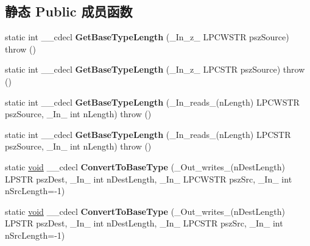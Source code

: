 \subsection*{静态 Public 成员函数}
\begin{DoxyCompactItemize}
\item 
\mbox{\label{class_a_t_l_1_1_ch_traits_c_r_t_3_01char_01_4_adeed7790ff8735455f8ae1ef589e29f2}} 
static int \+\_\+\+\_\+cdecl {\bfseries Get\+Base\+Type\+Length} (\+\_\+\+In\+\_\+z\+\_\+ L\+P\+C\+W\+S\+TR psz\+Source)  throw ()
\item 
\mbox{\label{class_a_t_l_1_1_ch_traits_c_r_t_3_01char_01_4_a719c0a99a89d2b62d39669a0d7d5be1a}} 
static int \+\_\+\+\_\+cdecl {\bfseries Get\+Base\+Type\+Length} (\+\_\+\+In\+\_\+z\+\_\+ L\+P\+C\+S\+TR psz\+Source)  throw ()
\item 
\mbox{\label{class_a_t_l_1_1_ch_traits_c_r_t_3_01char_01_4_a7b5636861c6a74c18d109f19419ca545}} 
static int \+\_\+\+\_\+cdecl {\bfseries Get\+Base\+Type\+Length} (\+\_\+\+In\+\_\+reads\+\_\+(n\+Length) L\+P\+C\+W\+S\+TR psz\+Source, \+\_\+\+In\+\_\+ int n\+Length)  throw ()
\item 
\mbox{\label{class_a_t_l_1_1_ch_traits_c_r_t_3_01char_01_4_a4024ea92fb975f57bca3d96a8671cfb2}} 
static int \+\_\+\+\_\+cdecl {\bfseries Get\+Base\+Type\+Length} (\+\_\+\+In\+\_\+reads\+\_\+(n\+Length) L\+P\+C\+S\+TR psz\+Source, \+\_\+\+In\+\_\+ int n\+Length)  throw ()
\item 
\mbox{\label{class_a_t_l_1_1_ch_traits_c_r_t_3_01char_01_4_a1bccd21d01f74118d7a79f47096ca535}} 
static \hyperlink{interfacevoid}{void} \+\_\+\+\_\+cdecl {\bfseries Convert\+To\+Base\+Type} (\+\_\+\+Out\+\_\+writes\+\_\+(n\+Dest\+Length) L\+P\+S\+TR psz\+Dest, \+\_\+\+In\+\_\+ int n\+Dest\+Length, \+\_\+\+In\+\_\+ L\+P\+C\+W\+S\+TR psz\+Src, \+\_\+\+In\+\_\+ int n\+Src\+Length=-\/1)
\item 
\mbox{\label{class_a_t_l_1_1_ch_traits_c_r_t_3_01char_01_4_aad5c6880e9613eea64133e902e08d21f}} 
static \hyperlink{interfacevoid}{void} \+\_\+\+\_\+cdecl {\bfseries Convert\+To\+Base\+Type} (\+\_\+\+Out\+\_\+writes\+\_\+(n\+Dest\+Length) L\+P\+S\+TR psz\+Dest, \+\_\+\+In\+\_\+ int n\+Dest\+Length, \+\_\+\+In\+\_\+ L\+P\+C\+S\+TR psz\+Src, \+\_\+\+In\+\_\+ int n\+Src\+Length=-\/1)

\end{DoxyCompactItemize}

